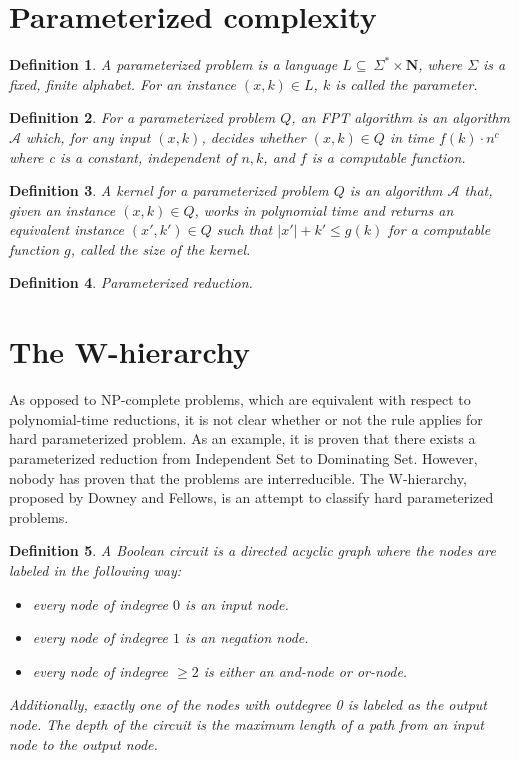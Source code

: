 \documentclass[en]{pracamgr}
\newtheorem{definition}{Definition}
\begin{document}
\section{Parameterized complexity}

\begin{definition}\label{Parameterized problem}
	A {\textup{parameterized problem}} is a language $L \subseteq \ \Sigma^* \times \mathbf{N}$, where $\Sigma$ is a fixed, finite alphabet. For an instance $(x,k) \in L$, $k$ is called the parameter.
\end{definition}

\begin{definition}\label{FPT algorithm}
	For a parameterized problem $Q$, an \textup{FPT algorithm} is an algorithm $\mathcal{A}$ which, for any input $(x,k)$, decides whether $(x,k) \in Q$ in time $f(k)\cdot n^c$ where c is a constant, independent of $n,k$, and $f$ is a computable function.
\end{definition}

\begin{definition}\label{Kernel}
	A \textup{kernel} for a parameterized problem $Q$ is an algorithm $\mathcal{A}$ that, given an instance $(x,k) \in Q$, works in polynomial time and returns an equivalent instance $(x',k') \in Q$
	such that $|x'| + k' \leq g(k)$ for a computable function $g$, called the \textup{size} of the kernel.
\end{definition}

\begin{definition}
	{\normalfont Parameterized reduction.}
\end{definition}

\section{The W-hierarchy}

As opposed to NP-complete problems, which are equivalent with respect to polynomial-time reductions, it is not clear whether or not the rule applies for hard parameterized problem. As an example, it is proven that there exists a parameterized reduction from Independent Set to Dominating Set. However, nobody has proven that the problems are interreducible. The W-hierarchy, proposed by Downey and Fellows, is an attempt to classify hard parameterized problems. 

\begin{definition}
	A {\textup Boolean circuit} is a directed acyclic graph where the nodes are labeled in the following way:
	\begin{itemize}
		\item every node of indegree $0$ is an input node.
		\item every node of indegree $1$ is an negation node.
		\item every node of indegree $\geq 2$ is either an and-node or or-node.
	\end{itemize}
	
	Additionally, exactly one of the nodes with outdegree 0 is labeled as the {\textup output node}. The {\textup depth} of the circuit is the maximum length of a path from an input node to the output node.
\end{definition}
\end{document}
